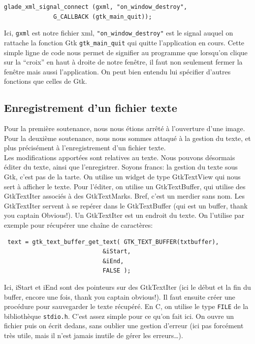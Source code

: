 \documentclass[a4paper,12pt]{report}
\begin{document}
\begin{lstlisting}
glade_xml_signal_connect (gxml, "on_window_destroy",
			  G_CALLBACK (gtk_main_quit));
\end{lstlisting}

Ici, \verb!gxml! est notre fichier xml, \verb!"on_window_destroy"! est le signal auquel on rattache la fonction Gtk \verb!gtk_main_quit! qui quitte l'application en cours. Cette simple ligne de code nous permet de signifier au programme que lorsqu'on clique sur la ``croix'' en haut \`a droite de notre fen\^etre, il faut non seulement fermer la fen\^etre mais aussi l'application.
On peut bien entendu lui sp\'ecifier d'autres fonctions que celles de Gtk.

\subsection{Enregistrement d'un fichier texte} %
\label{sec:enregistrement_d_un_fichier_texte}

Pour la premi\`ere soutenance, nous nous \'etions arr\^et\'e \`a l'ouverture d'une image.\\
Pour la deuxi\`eme soutenance, nous nous sommes attaqu\'e \`a la gestion du texte, et plus pr\'ecis\'ement \`a l'enregistrement d'un fichier texte.\\
Les modifications apport\'ees sont relatives au texte. Nous pouvons d\'esormais \'editer du texte, ainsi que l'enregistrer. Soyons francs: la gestion du texte sous Gtk, c'est pas de la tarte. On utilise un widget de type GtkTextView qui nous sert \`a afficher le texte. Pour l'\'editer, on utilise un GtkTextBuffer, qui utilise des GtkTextIter associ\'es \`a des GtkTextMarks. Bref, c'est un merdier sans nom.
Les GtkTextIter servent \`a se rep\'erer dans le GtkTextBuffer (qui est un buffer, thank you captain Obvious!). Un GtkTextIter est un endroit du texte. On l'utilise par exemple pour r\'ecup\'erer une cha\^ine de caract\`eres:
\begin{lstlisting}
 text = gtk_text_buffer_get_text( GTK_TEXT_BUFFER(txtbuffer),
                            &iStart,
                            &iEnd,
                            FALSE );
\end{lstlisting}
Ici, iStart et iEnd sont des pointeurs sur des GtkTextIter (ici le d\'ebut et la fin du buffer, encore une fois, thank you captain obvious!).
Il faut ensuite cr\'eer une proc\'edure pour sauvegarder le texte r\'ecup\'er\'e. En C, on utilise le type \verb!FILE! de la biblioth\`eque \verb!stdio.h!. C'est assez simple pour ce qu'on fait ici. On ouvre un fichier puis on \'ecrit dedans, sans oublier une gestion d'erreur (ici pas forc\'ement tr\`es utile, mais il n'est jamais inutile de g\'erer les erreurs\ldots).
\end{document}
